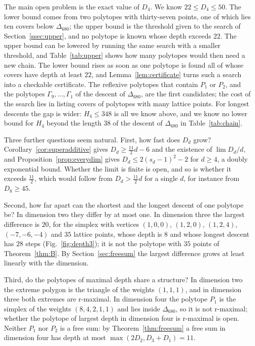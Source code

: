 \documentclass[11pt]{amsart}
\theoremstyle{definition}
\theoremstyle{remark}
\newcommand{\Dbig}{\Delta_{680}}
\newcommand{\UB}{348}
\newcommand{\LB}{22}
\newcommand{\UBs}{50}
\begin{document}
The main open problem is the exact value of $D_4$. We know
$\LB\le D_4\le\UBs$. The lower bound comes from two polytopes with
thirty-seven points, one of which lies ten covers below $\Dbig$; the upper
bound is the threshold given to the search of
Section~\ref{ssec:upper}, and no polytope is known whose depth exceeds
$\LB$. The upper bound can be lowered by running the same search with a
smaller threshold, and Table~\ref{tab:upper} shows how many polytopes
would then need a new chain. The lower bound rises as soon as one
polytope is found all of whose covers have depth at least $\LB$, and
Lemma~\ref{lem:certificate} turns such a search into a checkable
certificate. The reflexive polytopes that contain $P_1$ or $P_2$, and the
polytopes $\Gamma_9,\dots,\Gamma_1$ of the descent of $\Dbig$, are the
first candidates; the cost of the search lies in listing covers of
polytopes with many lattice points. For longest descents the gap is wider:
$H_4\le\UB$ is all we know above, and we know no lower bound for $H_4$
beyond the length $38$ of the descent of $\Dbig$ in
Table~\ref{tab:chain}.

Three further questions seem natural. First, how fast does $D_d$ grow?
Corollary~\ref{cor:superadditive} gives $D_d\ge\frac{11}{2}d-6$ and the
existence of $\lim D_d/d$, and Proposition~\ref{prop:everydim} gives
$D_d\le2(s_d-1)^2-2$ for $d\ge4$, a doubly exponential bound. Whether the
limit is finite is open, and so is whether it exceeds $\frac{11}{2}$,
which would follow from $D_d>\frac{11}{2}d$ for a single $d$, for instance
from $D_8\ge45$.

Second, how far apart can the shortest and the longest descent of one
polytope be? In dimension two they differ by at most one. In dimension
three the largest difference is $20$, for the simplex with vertices
$(1,0,0)$, $(1,2,0)$, $(1,2,4)$, $(-7,-6,-4)$ and $35$ lattice points,
whose depth is $8$ and whose longest descent has $28$ steps
(Fig.~\ref{fig:depth3}); it is not the polytope with $35$ points of
Theorem~\ref{thm:B}. By Section~\ref{sec:freesum} the largest difference
grows at least linearly with the dimension.

Third, do the polytopes of maximal depth share a structure? In dimension
two the extreme polygon is the triangle of the weights $(1,1,1)$, and in
dimension three both extremes are r-maximal. In dimension four the
polytope $P_1$ is the simplex of the weights $(8,4,2,1,1)$ and lies inside
$\Dbig$, so it is not r-maximal; whether the polytope of largest depth in
dimension four is r-maximal is open. Neither $P_1$ nor $P_2$ is a free sum: by
Theorem~\ref{thm:freesum} a free sum in dimension four has depth at most
$\max(2D_2,D_3+D_1)=11$.
\end{document}
